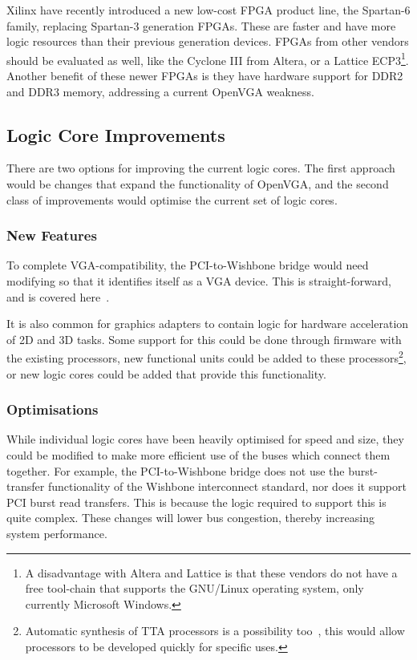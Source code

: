 Xilinx have recently introduced a new low-cost FPGA product line, the Spartan-6
family, replacing Spartan-3 generation FPGAs. These are faster and have more
logic resources than their previous generation devices. FPGAs from other vendors
should be evaluated as well, like the Cyclone III from Altera, or a Lattice
ECP3\footnote{A disadvantage with Altera and Lattice is that these vendors do not
have a free tool-chain that supports the GNU/Linux operating system, only
currently Microsoft Windows.}. Another benefit of these newer FPGAs is they have
hardware support for DDR2 and DDR3 memory, addressing a current OpenVGA weakness.


\subsection{Logic Core Improvements}
There are two options for improving the current logic cores. The first approach
would be changes that expand the functionality of OpenVGA, and the second class
of improvements would optimise the current set of logic cores.

\subsubsection{New Features}
To complete VGA-compatibility, the PCI-to-Wishbone bridge would need modifying
so that it identifies itself as a VGA device. This is straight-forward, and is
covered here~\cite{PCI_Spec}.

It is also common for graphics adapters to contain logic for hardware
acceleration of 2D and 3D tasks. Some support for this could be done through
firmware with the existing processors, new functional units could be added to
these processors\footnote{Automatic synthesis of TTA processors is a possibility
too~\cite{hoogerbrugge1995ast}, this would allow processors to be developed
quickly for specific uses.}, or new logic cores could be added that provide this
functionality.


\subsubsection{Optimisations}
While individual logic cores have been heavily optimised for speed and size, they
could be modified to make more efficient use of the buses which connect them
together. For example, the PCI-to-Wishbone bridge does not use the burst-transfer
functionality of the Wishbone interconnect standard, nor does it support PCI
burst read transfers. This is because the logic required to support this is quite
complex. These changes will lower bus congestion, thereby increasing system
performance.

